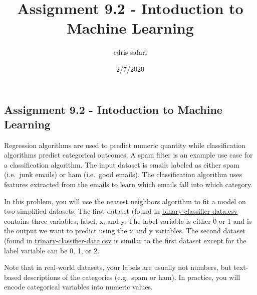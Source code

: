 \documentclass[
]{article}
\title{Assignment 9.2 - Intoduction to Machine Learning}
\author{edris safari}
\date{2/7/2020}
\begin{document}
\maketitle

\hypertarget{assignment-9.2---intoduction-to-machine-learning}{%
\subsection{Assignment 9.2 - Intoduction to Machine
Learning}\label{assignment-9.2---intoduction-to-machine-learning}}

Regression algorithms are used to predict numeric quantity while
classification algorithms predict categorical outcomes. A spam filter is
an example use case for a classification algorithm. The input dataset is
emails labeled as either spam (i.e.~junk emails) or ham (i.e.~good
emails). The classification algorithm uses features extracted from the
emails to learn which emails fall into which category.

In this problem, you will use the nearest neighbors algorithm to fit a
model on two simplified datasets. The first dataset (found in
\url{binary-classifier-data.csv} contains three variables; label, x, and
y. The label variable is either 0 or 1 and is the output we want to
predict using the x and y variables. The second dataset (found in
\url{trinary-classifier-data.csv} is similar to the first dataset except
for the label variable can be 0, 1, or 2.

Note that in real-world datasets, your labels are usually not numbers,
but text-based descriptions of the categories (e.g.~spam or ham). In
practice, you will encode categorical variables into numeric values.
\end{document}

